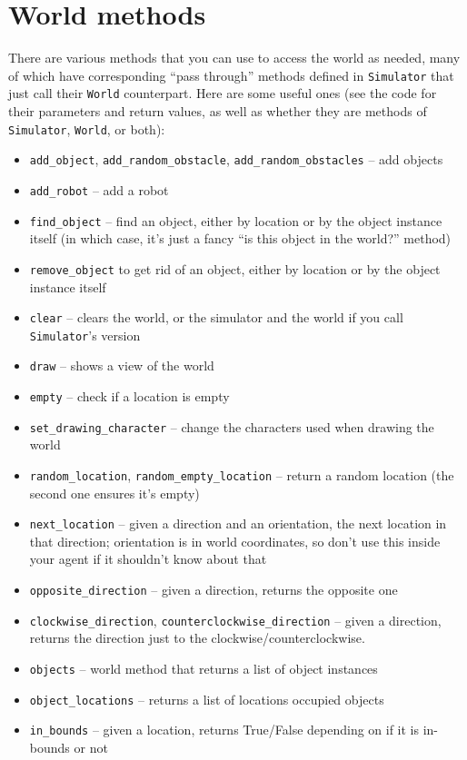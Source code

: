 \documentclass[11pt]{tufte-handout}
\begin{document}
\section{World methods}
\label{sec:org58f6068}

There are various methods that you can use to access the world as needed, many of which have corresponding ``pass through'' methods defined in \texttt{Simulator} that just call their \texttt{World} counterpart.  Here are some useful ones (see the code for their parameters and return values, as well as whether they are methods of  \texttt{Simulator}, \texttt{World}, or both):
\begin{itemize}
\item \texttt{add\_object}, \texttt{add\_random\_obstacle}, \texttt{add\_random\_obstacles} -- add objects
\item \texttt{add\_robot} -- add a robot
\item \texttt{find\_object} -- find an object, either by location or by the object instance itself (in which case, it's just a fancy ``is this object in the world?'' method)
\item \texttt{remove\_object} to get rid of an object, either by location or by the object instance itself
\item \texttt{clear} -- clears the world, or the simulator and the world if you call \texttt{Simulator}'s version
\item \texttt{draw} -- shows a view of the world
\item \texttt{empty} -- check if a location is empty
\item \texttt{set\_drawing\_character} -- change the characters used when drawing the world
\item \texttt{random\_location}, \texttt{random\_empty\_location} -- return a random location (the second one ensures it's empty)
\item \texttt{next\_location} --  given a direction and an orientation, the next location in that direction; orientation is in world coordinates, so don't use this inside your agent if it shouldn't know about that
\item \texttt{opposite\_direction} -- given a direction, returns the opposite one
\item \texttt{clockwise\_direction}, \texttt{counterclockwise\_direction} -- given a direction, returns the direction just to the clockwise/counterclockwise.
\item \texttt{objects}  -- world method that returns a list of object instances
\item \texttt{object\_locations} -- returns a list of  locations occupied objects
\item \texttt{in\_bounds} -- given a location, returns True/False depending on if it is in-bounds or not
\end{itemize}
\end{document}
